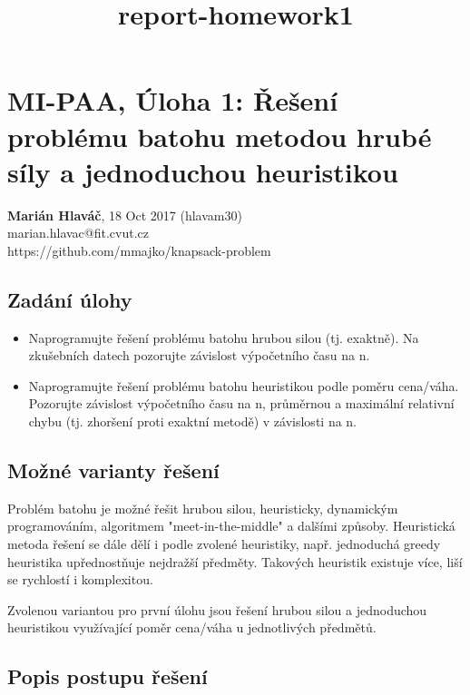 \documentclass[11pt]{article}
\title{report-homework1}
\providecommand{\tightlist}{%
      \setlength{\itemsep}{0pt}\setlength{\parskip}{0pt}}
\begin{document}
    

    
    \section{MI-PAA, Úloha 1: Řešení problému batohu metodou hrubé síly a
jednoduchou
heuristikou}\label{mi-paa-uxfaloha-1-ux159eux161enuxed-probluxe9mu-batohu-metodou-hrubuxe9-suxedly-a-jednoduchou-heuristikou}

\textbf{Marián Hlaváč}, 18 Oct 2017 (hlavam30)\\
marian.hlavac@fit.cvut.cz\\
https://github.com/mmajko/knapsack-problem

\subsection{Zadání úlohy}\label{zaduxe1nuxed-uxfalohy}

\begin{itemize}
\tightlist
\item
  Naprogramujte řešení problému batohu hrubou silou (tj. exaktně). Na
  zkušebních datech pozorujte závislost výpočetního času na n.
\item
  Naprogramujte řešení problému batohu heuristikou podle poměru
  cena/váha. Pozorujte závislost výpočetního času na n, průměrnou a
  maximální relativní chybu (tj. zhoršení proti exaktní metodě) v
  závislosti na n.
\end{itemize}

    \subsection{Možné varianty
řešení}\label{moux17enuxe9-varianty-ux159eux161enuxed}

Problém batohu je možné řešit hrubou silou, heuristicky, dynamickým
programováním, algoritmem "meet-in-the-middle" a dalšími způsoby.
Heuristická metoda řešení se dále dělí i podle zvolené heuristiky, např.
jednoduchá greedy heuristika upřednostňuje nejdražší předměty. Takových
heuristik existuje více, liší se rychlostí i komplexitou.

Zvolenou variantou pro první úlohu jsou řešení hrubou silou a
jednoduchou heuristikou využívající poměr cena/váha u jednotlivých
předmětů.

\subsection{Popis postupu řešení}\label{popis-postupu-ux159eux161enuxed}
\end{document}

